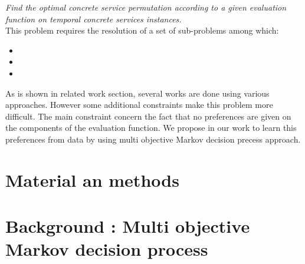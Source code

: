 \documentclass[10pt,journal,compsoc]{IEEEtran}
\newtheorem{definition}{Definition}
\begin{document}
{\it Find the optimal concrete service permutation according to a given evaluation function on temporal concrete services instances.} \\
This problem requires the resolution of a set of sub-problems among which:
\begin{itemize}
\item
\item
\item
\end{itemize}
As is shown in related work section, several works are done using various approaches. However some additional constraints make this problem more difficult. The main constraint concern the fact that no preferences are given on the components of the evaluation function. We propose in our work to learn this preferences from data by using multi objective Markov decision precess approach. 
 
\section{Material an methods}


\section{Background : Multi objective Markov decision process}
  

 
%  
%  
%
% 
\end{document}
